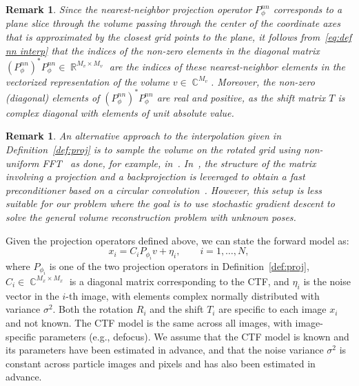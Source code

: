 \documentclass{article}
\DeclareMathOperator{\Rb}{\mathbb{R}}
\DeclareMathOperator{\Cb}{\mathbb{C}}
\newtheorem{remark}[theorem]{Remark}%
\begin{document}
\begin{remark}
    Since the nearest-neighbor projection operator $P^{nn}_{\phi}$ corresponds 
    to a plane slice through the volume passing through the center of the 
    coordinate axes that is approximated by the closest grid points to the plane,
    it follows from~\eqref{eq:def nn interp} that the indices of the non-zero 
    elements in the diagonal matrix $(P^{nn}_{\phi})^* P^{nn}_{\phi} \in \Rb^{M_v \times M_v}$ 
    are the indices of these nearest-neighbor elements in the vectorized 
    representation of the volume $v \in \Cb^{M_v}$.
    Moreover, the non-zero (diagonal) elements of $(P^{nn}_{\phi})^* P^{nn}_{\phi}$ are real 
    and positive, as the shift matrix $T$ is complex diagonal with elements of 
    unit absolute value.
    \label{rem:diag nn}
\end{remark}

\begin{remark}
    An alternative approach to the interpolation given in Definition~\ref{def:proj}
    is to sample the volume on the rotated grid using non-uniform 
    FFT~\cite{dutt_fast_1993, greengard_accelerating_2004,barnett_parallel_2019} 
    as done, for example, in~\cite{wang_fourier-based_2013}. In~\cite{anden_structural_2018},
    the structure of the matrix involving a projection and a backprojection is
    leveraged to obtain a fast preconditioner based on a circular convolution~\cite{tyrtyshnikov_optimal_1992}.
    However, this setup is less suitable for our problem where the goal is to use stochastic gradient descent to solve the general volume reconstruction problem with unknown poses. 
\end{remark}

Given the projection operators defined above, we can state the forward model as:
\begin{equation}
    x_i = C_i P_{\phi_i}v + \eta_i,
    \qquad i=1,\ldots,N,
    \label{eq:fwd model}
\end{equation}
where $P_{\phi_i} $ is one of the two projection operators in Definition~\ref{def:proj},
$C_i \in \Cb^{M_x \times M_x}$ is a diagonal matrix corresponding to the CTF,
and $\eta_i$ is the noise vector in the $i$-th image, with elements complex
normally distributed with variance $\sigma^2$. 
Both the rotation $R_i$ and the shift $T_i$ are specific to each image $x_i$ and 
not known. The CTF model is the same across all images, with image-specific parameters 
(e.g., defocus). We assume that the CTF model is known and its parameters have been
estimated in advance, and that the noise variance $\sigma^2$ is constant across 
particle images and pixels and has also been estimated in advance. 
\end{document}
